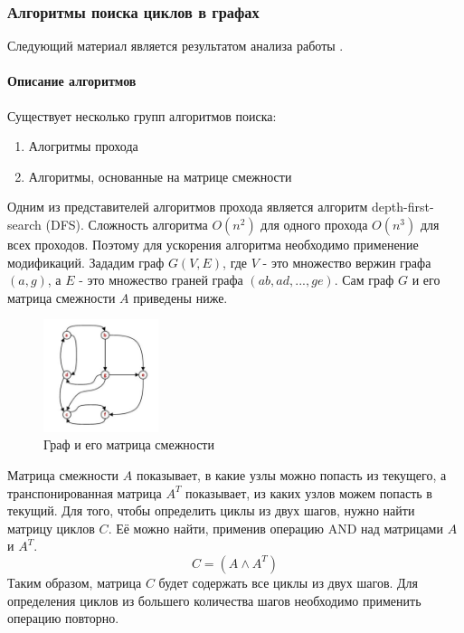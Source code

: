 \def\notedate{2021.11.14}
\def\currentauthor{Муха В. (РК6-73Б)}

\subsubsection{Алгоритмы поиска циклов в графах}
Следующий материал является результатом анализа работы \cite{davidrajuh2016}.

\paragraph{Описание алгоритмов}
Существует несколько групп алгоритмов поиска:
\begin{enumerate}
    \item Алогритмы прохода
    \item Алгоритмы, основанные на матрице смежности
\end{enumerate}

Одним из представителей алгоритмов прохода является алгоритм depth-first-search (DFS). Сложность алгоритма $O(n^2)$ для одного прохода  $O(n^3)$ для всех проходов. Поэтому для ускорения алгоритма необходимо применение модификаций. \cite{Mahdi2011}
\newline\newline
Зададим граф $G(V, E)$, где $V$ - это множество вержин графа $(a, g)$, а $E$ - это множество граней графа $(ab, ad, ... , ge)$. Сам граф $G$ и его матрица смежности $A$ приведены ниже.
\begin{figure}[H]
	\centering
	\includegraphics[width=0.3\textwidth]{ResearchNotes/rndhpc_not_edt_2021_11_14/adj_matrix.png}
	\caption{Граф и его матрица смежности} 
\end{figure}
Матрица смежности $A$ показывает, в какие узлы можно попасть из текущего, а транспонированная матрица $A^T$ показывает, из каких узлов можем попасть в текущий. 
Для того, чтобы определить циклы из двух шагов, нужно найти матрицу циклов $C$. Её можно найти, применив операцию AND над матрицами $A$ и $A^T$.
\begin{equation}
    C = (A \wedge A^T)
\end{equation}
Таким образом, матрица $C$ будет содержать все циклы из двух шагов. Для определения циклов из большего количества шагов необходимо применить операцию повторно.
